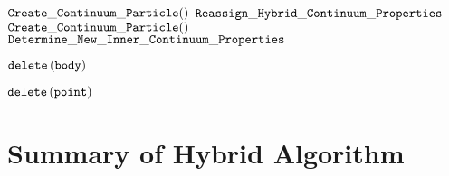 \begin{algorithm}
\caption{${\tt Continuum \_ Avoid \_ a \_ Void}$}
\begin{algorithmic}[1]
      \State ${\tt Create \_ Continuum \_ Particle}()$
    \EndFor
    \State ${\tt Reassign \_ Hybrid \_ Continuum \_ Properties}$
  \EndFor
      \State ${\tt Create \_ Continuum \_ Particle}()$
    \EndFor
    \State ${\tt Determine \_ New \_ Inner \_ Continuum \_ Properties}$ 
  \EndFor
\end{algorithmic} \label{alg:continuum_avoid_a_void}
\end{algorithm}

\begin{algorithm}
  \caption{${\tt Delete \_ Discrete \_ Grains}$}
  \begin{algorithmic}[1]
      \State ${\tt delete} \left({\tt body}\right)$  
    \EndIf
  \EndFor
  \end{algorithmic}
  \label{alg:delete_discrete_grains}
\end{algorithm}

\begin{algorithm}
  \caption{${\tt Delete \_ Continuum \_ Particles}$}
  \begin{algorithmic}[1]
      \State ${\tt delete} \left({\tt point}\right)$  
    \EndIf
  \EndFor
  \end{algorithmic}
  \label{alg:delete_continuum_particles}
\end{algorithm}

\section{Summary of Hybrid Algorithm}
